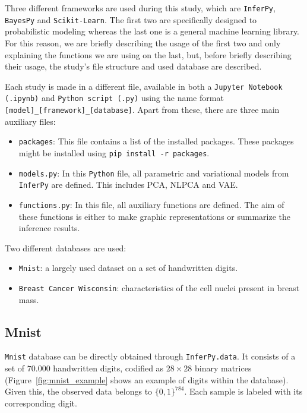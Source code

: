 
Three different frameworks are used during this study, which are \texttt{InferPy}, \texttt{BayesPy} and \texttt{Scikit-Learn}. The first two are specifically designed to probabilistic modeling whereas the last one is a general machine learning library. For this reason, we are briefly describing the usage of the first two and only explaining the functions we are using on the last, but, before briefly describing their usage, the study's file structure and used database are described.

Each study is made in a different file, available in both a \texttt{Jupyter Notebook (.ipynb)} and \texttt{Python script (.py)} using the name format \texttt{[model]\_[framework]\_[database]}. Apart from these, there are three main auxiliary files:

\begin{itemize}
  \item \texttt{packages}: This file contains a list of the installed packages. These packages might be installed using \texttt{pip install -r packages}.
  \item \texttt{models.py}: In this \texttt{Python} file, all parametric and variational models from \texttt{InferPy} are defined. This includes PCA, NLPCA and VAE.
  \item \texttt{functions.py}: In this file, all auxiliary functions are defined. The aim of these functions is either to make graphic representations or summarize the inference results.
\end{itemize}

Two different databases are used:
\begin{itemize}
  \item \texttt{Mnist}: a largely used dataset on a set of handwritten digits.
  \item \texttt{Breast Cancer Wisconsin}: characteristics of the cell nuclei present in breast mass.
\end{itemize}

\subsection{Mnist}

\texttt{Mnist} database can be directly obtained through \texttt{InferPy.data}. It consists of a set of \(70.000\)  handwritten digits, codified as \(28\times 28\) binary matrices (Figure~\ref{fig:mnist_example} shows an example of digits within the database). Given this, the observed data belongs to \(\{0,1\}^{784}\). Each sample is labeled with its corresponding digit.

